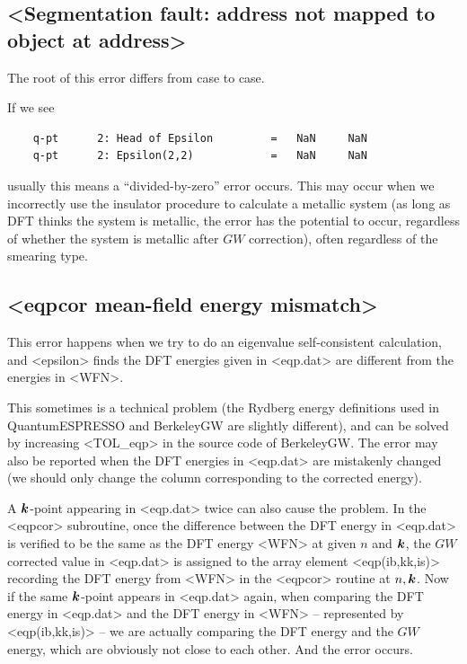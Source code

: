 \documentclass[hyperref, a4paper, 12pt]{report}
\def\texttt#1{<#1>}%
\newcommand{\shortcode}[1]{\texttt{#1}}
\begin{document}
\subsection{\shortcode{Segmentation fault: address not mapped to object at address}}\label{sec:segment-fault-1}

The root of this error differs from case to case.

If we see 
\begin{lstlisting}
    q-pt      2: Head of Epsilon         =   NaN     NaN    
    q-pt      2: Epsilon(2,2)            =   NaN     NaN    
\end{lstlisting}
usually this means a ``divided-by-zero'' error occurs.
This may occur when we incorrectly use the insulator procedure to calculate a metallic system 
(as long as DFT thinks the system is metallic, the error has the potential to occur,
regardless of whether the system is metallic after $GW$ correction),
often regardless of the smearing type. 

\subsection{\shortcode{eqpcor mean-field energy mismatch}}

This error happens when we try to do an eigenvalue self-consistent calculation,
and \shortcode{epsilon} finds the DFT energies given in \shortcode{eqp.dat} 
are different from the energies in \shortcode{WFN}.

This sometimes is a technical problem 
(the Rydberg energy definitions used in QuantumESPRESSO and BerkeleyGW are slightly different),
and can be solved by increasing \shortcode{TOL_eqp} in the source code of BerkeleyGW.
The error may also be reported 
when the DFT energies in \shortcode{eqp.dat} are mistakenly changed
(we should only change the column corresponding to the corrected energy).

A $\vb*{k}$-point appearing in \shortcode{eqp.dat} twice can also cause the problem.
In the \shortcode{eqpcor} subroutine,
once the difference between the DFT energy in \shortcode{eqp.dat}
is verified to be the same as the DFT energy \shortcode{WFN}
at given $n$ and $\vb*{k}$,
the $GW$ corrected value in \shortcode{eqp.dat} 
is assigned to the array element  \shortcode{eqp(ib,kk,is)}
recording the DFT energy from \shortcode{WFN} in the \shortcode{eqpcor} routine 
at $n, \vb*{k}$.
Now if the same $\vb*{k}$-point appears in \shortcode{eqp.dat} again, 
when comparing the DFT energy in \shortcode{eqp.dat} 
and the DFT energy in \shortcode{WFN} -- represented by \shortcode{eqp(ib,kk,is)} -- 
we are actually comparing the DFT energy and the $GW$ energy,
which are obviously not close to each other. 
And the error occurs.
\end{document}
